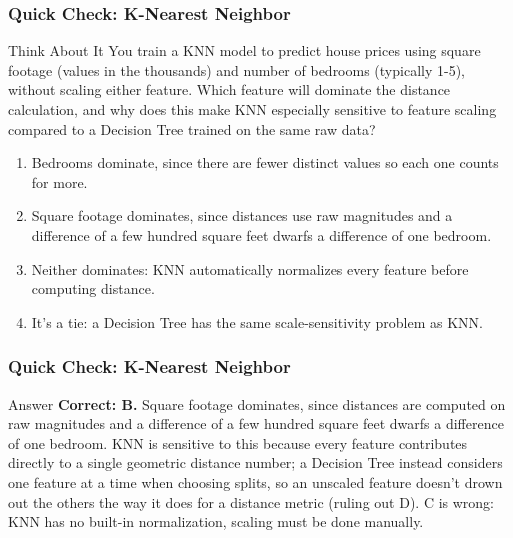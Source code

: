 \begin{frame}[fragile]\frametitle{Quick Check: K-Nearest Neighbor}
\begin{block}{Think About It}
You train a KNN model to predict house prices using square footage (values in the
thousands) and number of bedrooms (typically 1-5), without scaling either feature. Which
feature will dominate the distance calculation, and why does this make KNN especially
sensitive to feature scaling compared to a Decision Tree trained on the same raw data?
\begin{enumerate}
  \item[A.] Bedrooms dominate, since there are fewer distinct values so each one counts for more.
  \item[B.] Square footage dominates, since distances use raw magnitudes and a difference of a
  few hundred square feet dwarfs a difference of one bedroom.
  \item[C.] Neither dominates: KNN automatically normalizes every feature before computing distance.
  \item[D.] It's a tie: a Decision Tree has the same scale-sensitivity problem as KNN.
\end{enumerate}
\end{block}
\end{frame}

\begin{frame}[fragile]\frametitle{Quick Check: K-Nearest Neighbor}
\begin{block}{Answer}
\textbf{Correct: B.} Square footage dominates, since distances are computed on raw magnitudes
and a difference of a few hundred square feet dwarfs a difference of one bedroom. KNN is
sensitive to this because every feature contributes directly to a single geometric distance
number; a Decision Tree instead considers one feature at a time when choosing splits, so an
unscaled feature doesn't drown out the others the way it does for a distance metric (ruling
out D). C is wrong: KNN has no built-in normalization, scaling must be done manually.
\end{block}
\end{frame}




